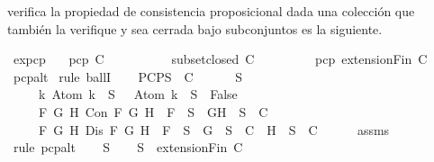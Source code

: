 \begin{isabellebody}
\begin{isamarkuptext}
  verifica la propiedad de consistencia proposicional dada una colección  que también la
  verifique y sea cerrada bajo subconjuntos es la siguiente.%
\end{isamarkuptext}\isamarkuptrue%
\isamarkupfalse%
\ ex{}{\isacharunderscore}pcp{\isacharcolon}\isanewline
\ \ \ {\isachardoublequoteopen}pcp\ C{\isachardoublequoteclose}\isanewline
\ \ \ \ \ \ \ \ \ \ {\isachardoublequoteopen}subset{\isacharunderscore}closed\ C{\isachardoublequoteclose}\isanewline
\ \ \ \ \ \ \ \ \ {\isachardoublequoteopen}pcp\ {\isacharparenleft}extensionFin\ C{\isacharparenright}{\isachardoublequoteclose}\isanewline
%
\isadelimproof
\ \ %
\endisadelimproof
%
\isatagproof
{}\isamarkupfalse%
\ pcp{\isacharunderscore}alt\isanewline
{}\isamarkupfalse%
\ {\isacharparenleft}rule\ ballI{\isacharparenright}\isanewline
\ \ \isamarkupfalse%
\ PCP{\isacharcolon}{\isachardoublequoteopen}{\isasymforall}S\ {\isasymin}\ C{\isachardot}\isanewline
\ \ \ \ {\isasymbottom}\ {\isasymnotin}\ S\isanewline
\ \ \ \ {\isasymand}\ {\isacharparenleft}{\isasymforall}k{\isachardot}\ Atom\ k\ {\isasymin}\ S\ {\isasymlongrightarrow}\ \isactrlbold {\isasymnot}\ {\isacharparenleft}Atom\ k{\isacharparenright}\ {\isasymin}\ S\ {\isasymlongrightarrow}\ False{\isacharparenright}\isanewline
\ \ \ \ {\isasymand}\ {\isacharparenleft}{\isasymforall}F\ G\ H{\isachardot}\ Con\ F\ G\ H\ {\isasymlongrightarrow}\ F\ {\isasymin}\ S\ {\isasymlongrightarrow}\ {\isacharbraceleft}G{\isacharcomma}H{\isacharbraceright}\ {\isasymunion}\ S\ {\isasymin}\ C{\isacharparenright}\isanewline
\ \ \ \ {\isasymand}\ {\isacharparenleft}{\isasymforall}F\ G\ H{\isachardot}\ Dis\ F\ G\ H\ {\isasymlongrightarrow}\ F\ {\isasymin}\ S\ {\isasymlongrightarrow}\ {\isacharbraceleft}G{\isacharbraceright}\ {\isasymunion}\ S\ {\isasymin}\ C\ {\isasymor}\ {\isacharbraceleft}H{\isacharbraceright}\ {\isasymunion}\ S\ {\isasymin}\ C{\isacharparenright}{\isachardoublequoteclose}\isanewline
\ \ \ \ \isamarkupfalse%
\ assms{\isacharparenleft}{}{\isacharparenright}\ \isamarkupfalse%
\ {\isacharparenleft}rule\ pcp{\isacharunderscore}alt{}{\isacharparenright}\isanewline
\ \ \isamarkupfalse%
\ S\isanewline
\ \ \isamarkupfalse%
\ {\isachardoublequoteopen}S\ {\isasymin}\ {\isacharparenleft}extensionFin\ C{\isacharparenright}{\isachardoublequoteclose}\isanewline
\ \ \isamarkupfalse%
\ \isamarkupfalse%

\end{isabellebody}
